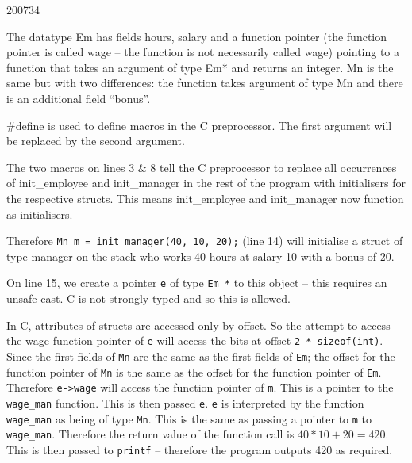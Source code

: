 \documentclass[10pt,\jkfside,a4paper]{article}
\begin{document}
\begin{examquestion}{2007}{3}{4}
\begin{enumerate}[label=(\alph*)]
The datatype Em has fields hours, salary and a function pointer
(the function pointer is called wage -- the function is not necessarily
called wage) pointing to a function that takes an argument of type Em* and
returns an integer. Mn is the same but with two differences: the
function takes argument of type Mn and there is an additional
field ``bonus''.

\#define is used to define macros in the C preprocessor.
The first argument will be replaced by the second argument.

The two macros on lines 3 \& 8 tell the C preprocessor to replace all
occurrences of init\_employee and init\_manager in the rest of the program
with initialisers for the respective structs. This means init\_employee and
init\_manager now function as initialisers.

Therefore \texttt{Mn m = init\_manager(40, 10, 20);} (line 14) will initialise
a struct of type manager on the stack who works 40 hours at salary 10 with a
bonus of 20.

On line 15, we create a pointer \texttt{e} of type \texttt{Em *} to this
object -- this requires an unsafe cast. C is not strongly typed and so this
is allowed.

In C, attributes of structs are accessed only by offset. So the attempt to
access the wage function pointer of \texttt{e} will access the bits at offset
\texttt{2 * sizeof(int)}. Since the first fields of \texttt{Mn} are the same
as the first fields of \texttt{Em}; the offset for the function pointer of
\texttt{Mn} is the same as the offset for the function pointer of \texttt{Em}.
Therefore \texttt{e->wage} will access the function pointer of \texttt{m}.
This is a pointer to the \texttt{wage\_man} function. This is then passed
\texttt{e}. \texttt{e} is interpreted by the function \texttt{wage\_man} as
being of type \texttt{Mn}. This is the same as passing a pointer to \texttt{m}
to \texttt{wage\_man}. Therefore the return value of the function call is
$40*10 + 20 = 420$. This is then passed to \texttt{printf} -- therefore the
program outputs 420 as required.

\end{enumerate}

\end{examquestion}
\end{document}
